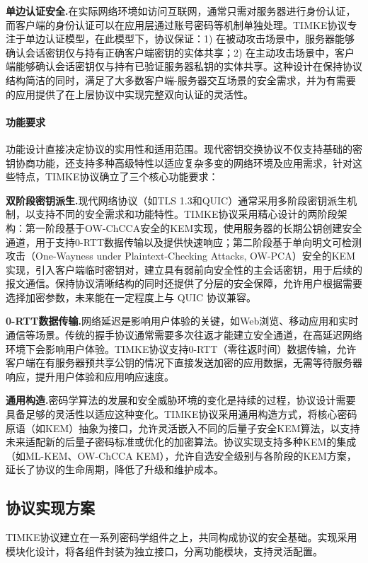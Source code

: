 \textbf{单边认证安全.}在实际网络环境如访问互联网，通常只需对服务器进行身份认证，而客户端的身份认证可以在应用层通过账号密码等机制单独处理。TIMKE协议专注于单边认证模型，在此模型下，协议保证：1) 在被动攻击场景中，服务器能够确认会话密钥仅与持有正确客户端密钥的实体共享；2) 在主动攻击场景中，客户端能够确认会话密钥仅与持有已验证服务器私钥的实体共享。这种设计在保持协议结构简洁的同时，满足了大多数客户端-服务器交互场景的安全需求，并为有需要的应用提供了在上层协议中实现完整双向认证的灵活性。

\paragraph{功能要求}
功能设计直接决定协议的实用性和适用范围。现代密钥交换协议不仅支持基础的密钥协商功能，还支持多种高级特性以适应复杂多变的网络环境及应用需求，针对这些特点，TIMKE协议确立了三个核心功能要求：

\textbf{双阶段密钥派生.}现代网络协议（如TLS 1.3和QUIC）通常采用多阶段密钥派生机制，以支持不同的安全需求和功能特性。TIMKE协议采用精心设计的两阶段架构：第一阶段基于OW-ChCCA安全的KEM实现，使用服务器的长期公钥创建安全通道，用于支持0-RTT数据传输以及提供快速响应；第二阶段基于单向明文可检测攻击（One-Wayness under Plaintext-Checking Attacks, OW-PCA）安全的KEM实现，引入客户端临时密钥对，建立具有弱前向安全性的主会话密钥，用于后续的报文通信。保持协议清晰结构的同时还提供了分层的安全保障，允许用户根据需要选择加密参数，未来能在一定程度上与 QUIC 协议兼容。
    
\textbf{0-RTT数据传输.}网络延迟是影响用户体验的关键，如Web浏览、移动应用和实时通信等场景。传统的握手协议通常需要多次往返才能建立安全通道，在高延迟网络环境下会影响用户体验。TIMKE协议支持0-RTT（零往返时间）数据传输，允许客户端在有服务器预共享公钥的情况下直接发送加密的应用数据，无需等待服务器响应，提升用户体验和应用响应速度。

\textbf{通用构造.}密码学算法的发展和安全威胁环境的变化是持续的过程，协议设计需要具备足够的灵活性以适应这种变化。TIMKE协议采用通用构造方式，将核心密码原语（如KEM）抽象为接口，允许灵活嵌入不同的后量子安全KEM算法，以支持未来适配新的后量子密码标准或优化的加密算法。协议实现支持多种KEM的集成（如ML-KEM、OW-ChCCA KEM），允许自选安全级别与各阶段的KEM方案，延长了协议的生命周期，降低了升级和维护成本。

\subsection{协议实现方案}

TIMKE协议建立在一系列密码学组件之上，共同构成协议的安全基础。实现采用模块化设计，将各组件封装为独立接口，分离功能模块，支持灵活配置。


